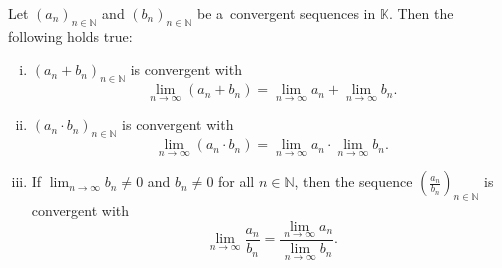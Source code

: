 

\begin{Theorem}
\label{thm:limformnormed}
  Let $(a_n)_{n\in\mathbb{N}}$ and $(b_n)_{n\in\mathbb{N}}$ be a~convergent sequences in $\mathbb{K}$. Then the following holds true:
\begin{enumerate}[(i)]
  \item $(a_n+b_n)_{n\in\mathbb{N}}$ is convergent with \[\lim_{n\to\infty}(a_n+b_n)= \lim_{n\to\infty}a_n+\lim_{n\to\infty}b_n.\]
  \item $( a_n\cdot b_n)_{n\in\mathbb{N}}$ is convergent with \[\lim_{n\to\infty}(a_n\cdot b_n)= \lim_{n\to\infty}a_n\cdot\lim_{n\to\infty}b_n.\]
  \item If $\lim_{n\to\infty}b_n\neq0$ and $b_n\neq0$ for all $n\in\mathbb{N}$, then the sequence $(\frac{a_n}{b_n})_{n\in\mathbb{N}}$ is convergent with \[\lim_{n\to\infty}\frac{a_n}{b_n}=\frac{\displaystyle\lim_{n\to\infty}a_n}{\displaystyle\lim_{n\to\infty}b_n}.\]
\end{enumerate}
\end{Theorem}
